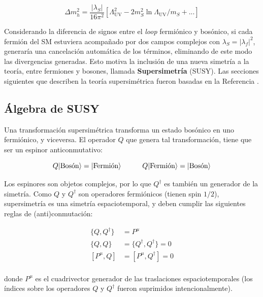 \begin{equation}
	\Delta m_h^2 = \frac{|\lambda_S|}{16 \pi^2}\left[\Lambda_{\text{UV}}^2 - 2m_S^2 \ln{\Lambda_{\text{UV}}/m_S} + ... \right]
\end{equation}

Considerando la diferencia de signos entre el \textit{loop} fermiónico y bosónico, si cada fermión del SM estuviera acompañado por dos campos complejos con $\lambda_S = |\lambda_f|^2$, generaría una cancelación automática de los términos, eliminando de este modo las divergencias generadas. Esto motiva la inclusión de una nueva simetría a la teoría, entre fermiones y bosones, llamada \textbf{Supersimetría} (SUSY). Las secciones siguientes que describen la teoría supersimétrica fueron basadas en la Referencia \cite{Martin:1997ns}.

\subsection{Álgebra de SUSY}

Una transformación supersimétrica transforma un estado bosónico en uno fermiónico, y viceversa. El operador $Q$ que genera tal transformación, tiene que ser un espinor anticonmutativo:

\begin{equation}
	Q\lvert\text{Bosón}\rangle = \lvert\text{Fermión}\rangle \quad\quad\quad Q\lvert\text{Fermión}\rangle = \lvert\text{Bosón}\rangle
\end{equation}

Los espinores son objetos complejos, por lo que $Q^{\dagger}$ es también un generador de la simetría. Como $Q$ y $Q^{\dagger}$ son operadores fermiónicos (tienen spin $1/2$), supersimetría es una simetría espaciotemporal, y deben cumplir las siguientes reglas de (anti)conmutación:

\begin{equation}
	\begin{split}	
		\{Q,Q^{\dagger}\} & = P^{\mu}\\
		\{Q,Q\} & = \{Q^{\dagger},Q^{\dagger}\} = 0\\
		[P^{\mu},Q] & = [P^{\mu},Q^{\dagger}] = 0\\
	\end{split}	
\end{equation}

\noindent
donde $P^{\mu}$ es el cuadrivector generador de las traslaciones espaciotemporales (los índices sobre los operadores $Q$ y $Q^{\dagger}$ fueron suprimidos intencionalmente).


